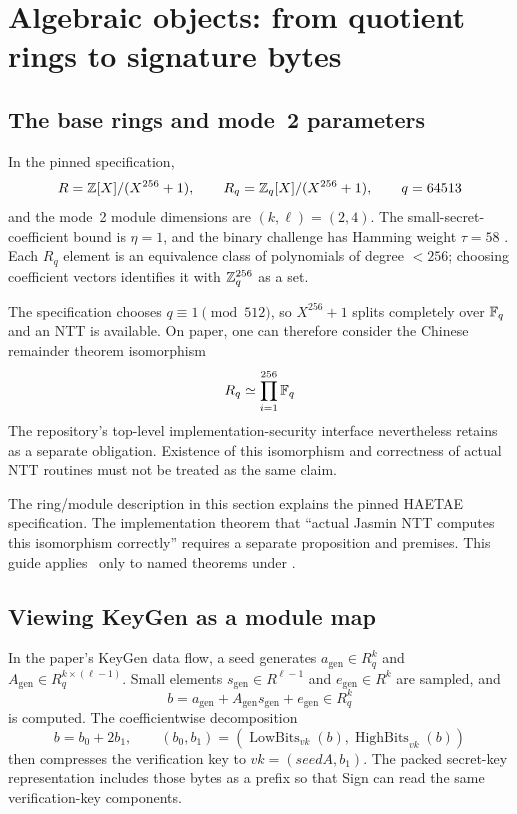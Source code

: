 \section{Algebraic objects: from quotient rings to signature bytes}
\label{sec:algebraic-object}

\subsection{The base rings and mode~2 parameters}

In the pinned specification,
\[
  R=\mathbb{Z}[X]/(X^{256}+1),\qquad
  R_q=\mathbb{Z}_q[X]/(X^{256}+1),\qquad q=64513
\]
and the mode~2 module dimensions are \((k,\ell)=(2,4)\).
The small-secret-coefficient bound is \(\eta=1\), and the binary challenge
has Hamming weight \(\tau=58\) \cite{haetae-spec}.
Each \(R_q\) element is an equivalence class of polynomials of degree
\(<256\); choosing coefficient vectors identifies it with \(\mathbb{Z}_q^{256}\)
as a set.

The specification chooses \(q\equiv1\pmod{512}\), so \(X^{256}+1\) splits
completely over \(\mathbb{F}_q\) and an NTT is available.
On paper, one can therefore consider the Chinese remainder theorem isomorphism
\[
  R_q\simeq\prod_{i=1}^{256}\mathbb{F}_q
\]
The repository's top-level implementation-security interface nevertheless
retains  as a separate obligation.
Existence of this isomorphism and correctness of actual NTT routines must not
be treated as the same claim.

\begin{caution}
The ring/module description in this section explains the pinned HAETAE
specification. The implementation theorem that “actual Jasmin NTT computes
this isomorphism correctly” requires a separate proposition and premises.
This guide applies \statusproved\ only to named theorems under
.
\end{caution}

\subsection{Viewing KeyGen as a module map}

In the paper's KeyGen data flow, a seed generates
\(a_{\mathrm{gen}}\in R_q^k\) and
\(A_{\mathrm{gen}}\in R_q^{k\times(\ell-1)}\).
Small elements \(s_{\mathrm{gen}}\in R^{\ell-1}\) and
\(e_{\mathrm{gen}}\in R^k\) are sampled, and
\[
  b=a_{\mathrm{gen}}+A_{\mathrm{gen}}s_{\mathrm{gen}}
      +e_{\mathrm{gen}}\in R_q^k
\]
is computed. The coefficientwise decomposition
\[
  b=b_0+2b_1,\qquad
  (b_0,b_1)=
  (\operatorname{LowBits}_{vk}(b),
   \operatorname{HighBits}_{vk}(b))
\]
then compresses the verification key to \(vk=(\mathit{seedA},b_1)\).
The packed secret-key representation includes those bytes as a prefix so that
Sign can read the same verification-key components.


